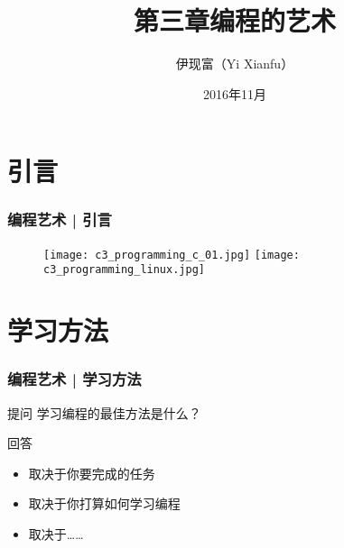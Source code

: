 


\title[编程的艺术]{第三章\quad 编程的艺术}
\author[Yixf]{伊现富（Yi Xianfu）}
\date{2016年11月}



\section{引言}
\begin{frame}
  \frametitle{编程艺术 | 引言}
  \begin{figure}
    \centering
    \texttt{[image: c3\_programming\_c\_01.jpg]}
    \quad
    \texttt{[image: c3\_programming\_linux.jpg]}
  \end{figure}
\end{frame}

\section{学习方法}
\begin{frame}
  \frametitle{编程艺术 | 学习方法}
  \begin{block}{提问}
 学习编程的最佳方法是什么？ 
  \end{block}
  \pause
  \begin{block}{回答}
    \begin{itemize}
      \item 取决于你要完成的任务
      \item 取决于你打算如何学习编程
      \item 取决于……
    \end{itemize}
  \end{block}
\end{frame}

